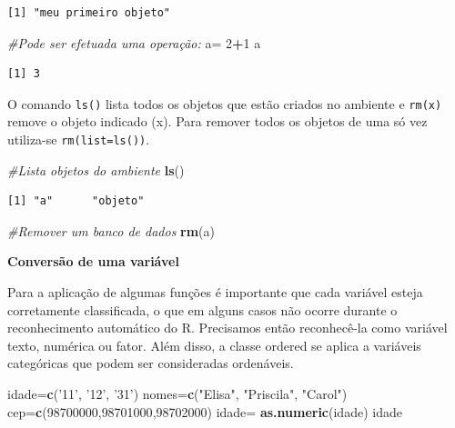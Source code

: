 \documentclass[12pt,brazil,oneside]{book}
\newenvironment{Shaded}{\begin{snugshade}}{\end{snugshade}}
\newcommand{\CommentTok}[1]{\textcolor[rgb]{0.56,0.35,0.01}{\textit{#1}}}
\newcommand{\DecValTok}[1]{\textcolor[rgb]{0.00,0.00,0.81}{#1}}
\newcommand{\KeywordTok}[1]{\textcolor[rgb]{0.13,0.29,0.53}{\textbf{#1}}}
\newcommand{\NormalTok}[1]{#1}
\newcommand{\OperatorTok}[1]{\textcolor[rgb]{0.81,0.36,0.00}{\textbf{#1}}}
\newcommand{\StringTok}[1]{\textcolor[rgb]{0.31,0.60,0.02}{#1}}
\begin{document}
\begin{verbatim}
[1] "meu primeiro objeto"
\end{verbatim}

\begin{Shaded}
\begin{Highlighting}[]
\CommentTok{#Pode ser efetuada uma operação:}
\NormalTok{a=}\StringTok{ }\DecValTok{2}\OperatorTok{+}\DecValTok{1}
\NormalTok{a}
\end{Highlighting}
\end{Shaded}

\begin{verbatim}
[1] 3
\end{verbatim}

O comando \texttt{ls()} lista todos os objetos que estão criados no ambiente e \texttt{rm(x)} remove o objeto indicado (x). Para remover todos os objetos de uma só vez utiliza-se \texttt{rm(list=ls())}.

\begin{Shaded}
\begin{Highlighting}[]
\CommentTok{#Lista objetos do ambiente}
\KeywordTok{ls}\NormalTok{()}
\end{Highlighting}
\end{Shaded}

\begin{verbatim}
[1] "a"      "objeto"
\end{verbatim}

\begin{Shaded}
\begin{Highlighting}[]
\CommentTok{#Remover um banco de dados}
\KeywordTok{rm}\NormalTok{(a)}
\end{Highlighting}
\end{Shaded}

\textbf{Conversão de uma variável}

Para a aplicação de algumas funções é importante que cada variável esteja corretamente classificada, o que em alguns casos não ocorre durante o reconhecimento automático do R. Precisamos então reconhecê-la como variável texto, numérica ou fator. Além disso, a classe ordered se aplica a variáveis categóricas que podem ser consideradas ordenáveis.

\begin{Shaded}
\begin{Highlighting}[]
\NormalTok{idade=}\KeywordTok{c}\NormalTok{(}\StringTok{'11'}\NormalTok{, }\StringTok{'12'}\NormalTok{, }\StringTok{'31'}\NormalTok{)}
\NormalTok{nomes=}\KeywordTok{c}\NormalTok{(}\StringTok{"Elisa"}\NormalTok{, }\StringTok{"Priscila"}\NormalTok{, }\StringTok{"Carol"}\NormalTok{)}
\NormalTok{cep=}\KeywordTok{c}\NormalTok{(}\DecValTok{98700000}\NormalTok{,}\DecValTok{98701000}\NormalTok{,}\DecValTok{98702000}\NormalTok{)}
\NormalTok{idade=}\StringTok{ }\KeywordTok{as.numeric}\NormalTok{(idade)}
\NormalTok{idade}
\end{Highlighting}
\end{Shaded}
\end{document}
